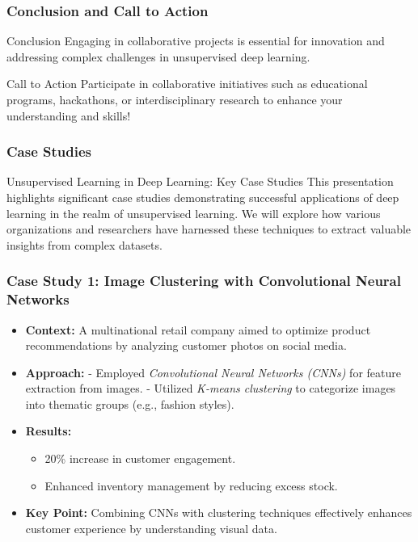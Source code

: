\documentclass[aspectratio=169]{beamer}
\begin{document}
\begin{frame}[fragile]
    \frametitle{Conclusion and Call to Action}
    \begin{block}{Conclusion}
        Engaging in collaborative projects is essential for innovation and addressing complex challenges in unsupervised deep learning.
    \end{block}
    \begin{block}{Call to Action}
        Participate in collaborative initiatives such as educational programs, hackathons, or interdisciplinary research to enhance your understanding and skills!
    \end{block}
\end{frame}

\begin{frame}[fragile]
  \frametitle{Case Studies}
  \begin{block}{Unsupervised Learning in Deep Learning: Key Case Studies}
    This presentation highlights significant case studies demonstrating successful applications of deep learning in the realm of unsupervised learning. We will explore how various organizations and researchers have harnessed these techniques to extract valuable insights from complex datasets.
  \end{block}
\end{frame}

\begin{frame}[fragile]
  \frametitle{Case Study 1: Image Clustering with Convolutional Neural Networks}
  \begin{itemize}
    \item \textbf{Context:} 
      A multinational retail company aimed to optimize product recommendations by analyzing customer photos on social media.
    \item \textbf{Approach:} 
      - Employed \textit{Convolutional Neural Networks (CNNs)} for feature extraction from images.
      - Utilized \textit{K-means clustering} to categorize images into thematic groups (e.g., fashion styles).
    \item \textbf{Results:} 
      \begin{itemize}
        \item 20\% increase in customer engagement.
        \item Enhanced inventory management by reducing excess stock.
      \end{itemize}
    \item \textbf{Key Point:} 
      Combining CNNs with clustering techniques effectively enhances customer experience by understanding visual data.
  \end{itemize}
\end{frame}
\end{document}
